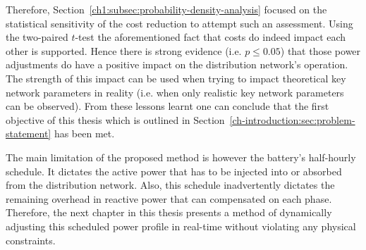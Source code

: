 Therefore, Section~\ref{ch1:subsec:probability-density-analysis} focused on the statistical sensitivity of the cost reduction to attempt such an assessment.
Using the two-paired $t$-test the aforementioned fact that costs do indeed impact each other is supported.
Hence there is strong evidence (i.e. $p\leq0.05$) that those power adjustments do have a positive impact on the distribution network's operation.
The strength of this impact can be used when trying to impact theoretical key network parameters in reality (i.e. when only realistic key network parameters can be observed).
From these lessons learnt one can conclude that the first objective of this thesis which is outlined in Section~\ref{ch-introduction:sec:problem-statement} has been met.

The main limitation of the proposed method is however the battery's half-hourly schedule.
It dictates the active power that has to be injected into or absorbed from the distribution network.
Also, this schedule inadvertently dictates the remaining overhead in reactive power that can compensated on each phase.
Therefore, the next chapter in this thesis presents a method of dynamically adjusting this scheduled power profile in real-time without violating any physical constraints.
